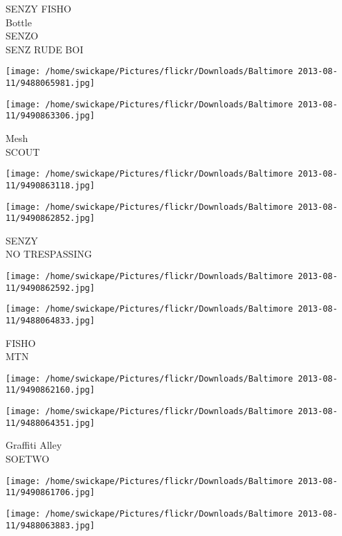 \documentclass[10pt,letterpaper]{article}
\begin{document}
SENZY FISHO\\
Bottle\\
SENZO\\
SENZ RUDE BOI\\
\pagebreak

\texttt{[image: /home/swickape/Pictures/flickr/Downloads/Baltimore 2013-08-11/9488065981.jpg]}

\vspace{0.25in}
\texttt{[image: /home/swickape/Pictures/flickr/Downloads/Baltimore 2013-08-11/9490863306.jpg]}

Mesh\\
SCOUT\\
\pagebreak

\texttt{[image: /home/swickape/Pictures/flickr/Downloads/Baltimore 2013-08-11/9490863118.jpg]}

\vspace{0.25in}
\texttt{[image: /home/swickape/Pictures/flickr/Downloads/Baltimore 2013-08-11/9490862852.jpg]}

SENZY\\
NO TRESPASSING\\
\pagebreak

\texttt{[image: /home/swickape/Pictures/flickr/Downloads/Baltimore 2013-08-11/9490862592.jpg]}

\vspace{0.25in}
\texttt{[image: /home/swickape/Pictures/flickr/Downloads/Baltimore 2013-08-11/9488064833.jpg]}

FISHO\\
MTN\\
\pagebreak

\texttt{[image: /home/swickape/Pictures/flickr/Downloads/Baltimore 2013-08-11/9490862160.jpg]}

\vspace{0.25in}
\texttt{[image: /home/swickape/Pictures/flickr/Downloads/Baltimore 2013-08-11/9488064351.jpg]}

Graffiti Alley\\
SOETWO\\
\pagebreak

\texttt{[image: /home/swickape/Pictures/flickr/Downloads/Baltimore 2013-08-11/9490861706.jpg]}

\vspace{0.25in}
\texttt{[image: /home/swickape/Pictures/flickr/Downloads/Baltimore 2013-08-11/9488063883.jpg]}
\end{document}
